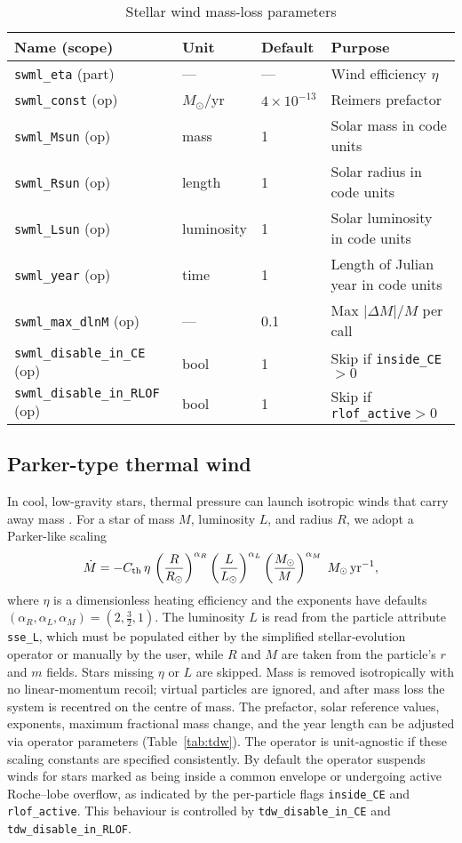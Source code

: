\documentclass[11pt]{article}
\begin{document}
\begin{table}[h]
\centering\footnotesize
\caption{Stellar wind mass-loss parameters}
\label{tab:swml}
\begin{tabular}{@{}llll@{}}
\toprule
Name (scope) & Unit & Default & Purpose \\
\midrule
\texttt{swml\_eta} (part) & — & — & Wind efficiency $\eta$\\
\texttt{swml\_const} (op) & $M_\odot$/yr & $4\times10^{-13}$ & Reimers prefactor\\
\texttt{swml\_Msun}  (op) & mass & 1 & Solar mass in code units\\
\texttt{swml\_Rsun}  (op) & length & 1 & Solar radius in code units\\
\texttt{swml\_Lsun}  (op) & luminosity & 1 & Solar luminosity in code units\\
\texttt{swml\_year}  (op) & time & 1 & Length of Julian year in code units\\
\texttt{swml\_max\_dlnM} (op) & — & 0.1 & Max $|\Delta M|/M$ per call\\
\texttt{swml\_disable\_in\_CE} (op) & bool & 1 & Skip if \texttt{inside\_CE}$>0$\\
\texttt{swml\_disable\_in\_RLOF} (op) & bool & 1 & Skip if \texttt{rlof\_active}$>0$\\
\bottomrule
\end{tabular}
\end{table}

\subsection{Parker-type thermal wind}
\label{sec:tdw}

In cool, low-gravity stars, thermal pressure can launch isotropic winds that carry away mass \citep{parker}. For a star
of mass $M$, luminosity $L$, and radius $R$, we adopt a Parker-like scaling
\[
\dot M = -C_{\rm th}\,\eta\,\left(\frac{R}{R_\odot}\right)^{\alpha_R}
                   \left(\frac{L}{L_\odot}\right)^{\alpha_L}
                   \left(\frac{M_\odot}{M}\right)^{\alpha_M}
\;M_\odot\,\mathrm{yr}^{-1},
\]
where $\eta$ is a dimensionless heating efficiency and the exponents have
defaults $(\alpha_R,\alpha_L,\alpha_M)=(2,\tfrac{3}{2},1)$.  The luminosity
$L$ is read from the particle attribute \texttt{sse\_L}, which must be
populated either by the simplified stellar‑evolution operator or manually by
the user, while $R$ and $M$ are taken from the particle's $r$ and $m$ fields.
Stars missing $\eta$ or $L$ are skipped. Mass is removed isotropically
with no linear-momentum recoil; virtual particles are ignored, and after mass
loss the system is recentred on the centre of mass.  The prefactor, solar
reference values, exponents, maximum fractional mass change, and the year
length can be adjusted via operator parameters (Table~\ref{tab:tdw}). The
operator is unit-agnostic if these scaling constants are specified
consistently.
By default the operator suspends winds for stars marked as being inside a
common envelope or undergoing active Roche--lobe overflow, as indicated by
the per-particle flags \texttt{inside\_CE} and \texttt{rlof\_active}.  This
behaviour is controlled by \texttt{tdw\_disable\_in\_CE} and
\texttt{tdw\_disable\_in\_RLOF}.
\end{document}
